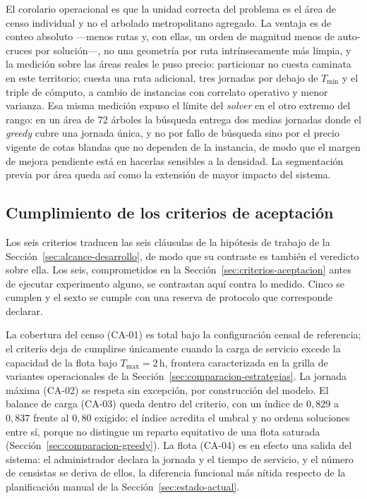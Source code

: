 El corolario operacional es que la unidad correcta del problema es el área de censo individual y no
el arbolado metropolitano agregado. La ventaja es de conteo absoluto ---menos rutas y, con ellas,
un orden de magnitud menos de auto-cruces por solución---, no una geometría por ruta
intrínsecamente más limpia, y la medición sobre las áreas reales le puso precio: particionar no
cuesta caminata en este territorio; cuesta una ruta adicional, tres jornadas por debajo de
$T_{\min}$ y el triple de cómputo, a cambio de instancias con correlato operativo y menor varianza.
Esa misma medición expuso el límite del \textit{solver} en el otro extremo del rango: en un área de
72 árboles la búsqueda entrega dos medias jornadas donde el \textit{greedy} cubre una jornada
única, y no por fallo de búsqueda sino por el precio vigente de cotas blandas que no dependen de la
instancia, de modo que el margen de mejora pendiente está en hacerlas sensibles a la densidad. La
segmentación previa por área queda así como la extensión de mayor impacto del sistema.

\subsection{Cumplimiento de los criterios de aceptación}
\label{sec:cumplimiento-criterios}

Los seis criterios traducen las seis cláusulas de la hipótesis de trabajo de la
Sección~\ref{sec:alcance-desarrollo}, de modo que su contraste es también el veredicto sobre ella.
Los seis, comprometidos en la Sección~\ref{sec:criterios-aceptacion} antes de ejecutar
experimento alguno, se contrastan aquí contra lo medido. Cinco se cumplen y el sexto se cumple con
una reserva de protocolo que corresponde declarar.

La cobertura del censo (CA-01) es total bajo la configuración censal de referencia; el criterio
deja de cumplirse únicamente cuando la carga de servicio excede la capacidad de la flota bajo
$T_{\max}=2$\,h, frontera caracterizada en la grilla de variantes operacionales de la
Sección~\ref{sec:comparacion-estrategias}. La jornada máxima
(CA-02) se respeta sin excepción, por construcción del modelo. El balance de carga (CA-03) queda
dentro del criterio, con un índice de $0{,}829$ a $0{,}837$ frente al $0{,}80$ exigido; el índice
acredita el umbral y no ordena soluciones entre sí, porque no distingue un reparto equitativo de
una flota saturada (Sección~\ref{sec:comparacion-greedy}). La flota (CA-04) es en efecto una salida
del sistema: el administrador declara la jornada y el tiempo de servicio, y el número de censistas
se deriva de ellos, la diferencia funcional más nítida respecto de la planificación manual de la
Sección~\ref{sec:estado-actual}.

